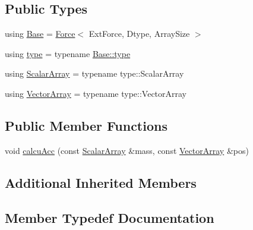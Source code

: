 \subsection*{Public Types}
\begin{DoxyCompactItemize}
\item 
using \mbox{\hyperlink{struct_space_h_1_1_ext_vel_indep_force_acf786913cd012bc90bb02f9ae1f87e91}{Base}} = \mbox{\hyperlink{struct_space_h_1_1_force}{Force}}$<$ Ext\+Force, Dtype, Array\+Size $>$
\item 
using \mbox{\hyperlink{struct_space_h_1_1_ext_vel_indep_force_a6db7150bace18b57cb059989c7f29e50}{type}} = typename \mbox{\hyperlink{struct_space_h_1_1_force_a151c6ae1ec7ad87825c2b6cc74aee5f2}{Base\+::type}}
\item 
using \mbox{\hyperlink{struct_space_h_1_1_ext_vel_indep_force_afe9c9f6c747f7b82f5e1058f5df2f2af}{Scalar\+Array}} = typename type\+::\+Scalar\+Array
\item 
using \mbox{\hyperlink{struct_space_h_1_1_ext_vel_indep_force_ae9d2ecd856cbcfa1cc848003a8450adf}{Vector\+Array}} = typename type\+::\+Vector\+Array
\end{DoxyCompactItemize}
\subsection*{Public Member Functions}
\begin{DoxyCompactItemize}
\item 
void \mbox{\hyperlink{struct_space_h_1_1_ext_vel_indep_force_ade2a9eececdb0833213048c1e73c7756}{calcu\+Acc}} (const \mbox{\hyperlink{struct_space_h_1_1_ext_vel_indep_force_afe9c9f6c747f7b82f5e1058f5df2f2af}{Scalar\+Array}} \&mass, const \mbox{\hyperlink{struct_space_h_1_1_ext_vel_indep_force_ae9d2ecd856cbcfa1cc848003a8450adf}{Vector\+Array}} \&pos)
\end{DoxyCompactItemize}
\subsection*{Additional Inherited Members}


\subsection{Member Typedef Documentation}
\mbox{\label{struct_space_h_1_1_ext_vel_indep_force_acf786913cd012bc90bb02f9ae1f87e91}} 
